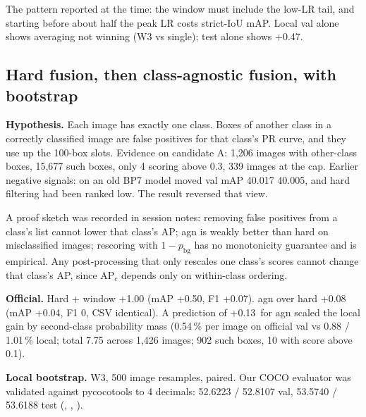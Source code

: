 The pattern reported at the time: the window must include the low-LR tail, and starting before about half the peak LR costs strict-IoU mAP. Local val alone shows averaging not winning (W3  vs single); test alone shows +0.47.

\subsection{Hard fusion, then class-agnostic fusion, with bootstrap}
\label{sec:fusion}

\textbf{Hypothesis.} Each image has exactly one class. Boxes of another class in a correctly classified image are false positives for that class's PR curve, and they use up the 100-box slots. Evidence on candidate A: 1,206 images with other-class boxes, 15,677 such boxes, only 4 scoring above 0.3, 339 images at the cap\sn{}. Earlier negative signals: on an old BP7 model  moved val mAP 40.017 \to{} 40.005\sn{}, and hard filtering had been ranked low. The result reversed that view.

A proof sketch was recorded in session notes\sn{}: removing false positives from a class's list cannot lower that class's AP; agn is weakly better than hard on misclassified images; rescoring with $1-p_{\text{bg}}$ has no monotonicity guarantee and is empirical. Any post-processing that only rescales one class's scores cannot change that class's AP, since AP$_c$ depends only on within-class ordering\sn{}.

\textbf{Official.} Hard + window +1.00 (mAP +0.50, F1 +0.07). agn over hard +0.08 (mAP +0.04, F1 0, CSV identical). A prediction of +0.13\,\dm{} for agn\sn{} scaled the local gain by second-class probability mass (0.54\,\% per image on official val vs 0.88 / 1.01\,\% local; total 7.75 across 1,426 images; 902 such boxes, 10 with score above 0.1).

\textbf{Local bootstrap.} W3, 500 image resamples, paired. Our COCO evaluator was validated against pycocotools to 4 decimals: 52.6223 / 52.8107 val, 53.5740 / 53.6188 test (, , ).


